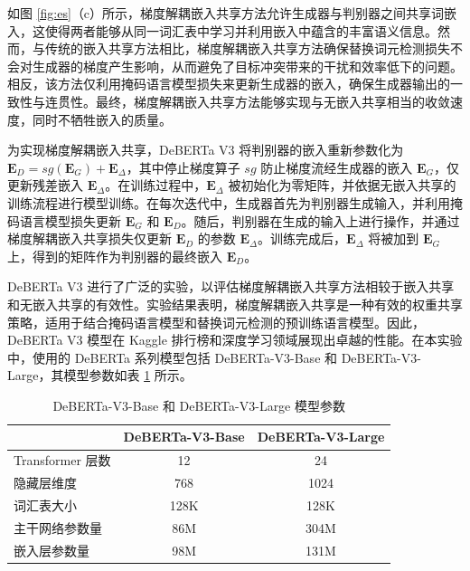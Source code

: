 如图 \ref{fig:es}（c）所示，梯度解耦嵌入共享方法允许生成器与判别器之间共享词嵌入，这使得两者能够从同一词汇表中学习并利用嵌入中蕴含的丰富语义信息。然而，与传统的嵌入共享方法相比，梯度解耦嵌入共享方法确保替换词元检测损失不会对生成器的梯度产生影响，从而避免了目标冲突带来的干扰和效率低下的问题。相反，该方法仅利用掩码语言模型损失来更新生成器的嵌入，确保生成器输出的一致性与连贯性。最终，梯度解耦嵌入共享方法能够实现与无嵌入共享相当的收敛速度，同时不牺牲嵌入的质量。

为实现梯度解耦嵌入共享，DeBERTa V3 将判别器的嵌入重新参数化为 \(\mathbf{E}_D = sg(\mathbf{E}_G) + \mathbf{E}_{\Delta}\)，其中停止梯度算子 \(sg\) 防止梯度流经生成器的嵌入 \(\mathbf{E}_G\)，仅更新残差嵌入 \(\mathbf{E}_{\Delta}\)。在训练过程中，\(\mathbf{E}_{\Delta}\) 被初始化为零矩阵，并依据无嵌入共享的训练流程进行模型训练。在每次迭代中，生成器首先为判别器生成输入，并利用掩码语言模型损失更新 \(\mathbf{E}_G\) 和 \(\mathbf{E}_D\)。随后，判别器在生成的输入上进行操作，并通过梯度解耦嵌入共享损失仅更新 \(\mathbf{E}_D\) 的参数 \(\mathbf{E}_{\Delta}\)。训练完成后，\(\mathbf{E}_{\Delta}\) 将被加到 \(\mathbf{E}_G\) 上，得到的矩阵作为判别器的最终嵌入 \(\mathbf{E}_D\)。

DeBERTa V3 进行了广泛的实验，以评估梯度解耦嵌入共享方法相较于嵌入共享和无嵌入共享的有效性。实验结果表明，梯度解耦嵌入共享是一种有效的权重共享策略，适用于结合掩码语言模型和替换词元检测的预训练语言模型。因此，DeBERTa V3 模型在 Kaggle 排行榜和深度学习领域展现出卓越的性能。在本实验中，使用的 DeBERTa 系列模型包括 DeBERTa-V3-Base 和 DeBERTa-V3-Large，其模型参数如表 \ref{tab:deberta-parameter} 所示。

\begin{table}[htbp]
\centering
\caption{DeBERTa-V3-Base 和 DeBERTa-V3-Large 模型参数} \label{tab:deberta-parameter}
\begin{tabular}{lcc}
\toprule
               & \multicolumn{1}{l}{\textbf{DeBERTa-V3-Base} \cite{he2023debertav3improvingdebertausing}} & \multicolumn{1}{l}{\textbf{DeBERTa-V3-Large} \cite{he2023debertav3improvingdebertausing}} \\ \midrule
Transformer 层数 & 12                                           & 24                                            \\
隐藏层维度          & 768                                          & 1024                                          \\
词汇表大小          & 128K                                         & 128K                                          \\
主干网络参数量        & 86M                                          & 304M                                          \\
嵌入层参数量         & 98M                                          & 131M                                \\ \bottomrule         
\end{tabular}
\end{table}

